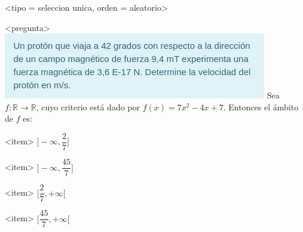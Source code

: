 <tipo = seleccion unica, orden = aleatorio>

<pregunta>
\includegraphics{preg1.png}
Sea $f:\mathbb R \to \mathbb R$, cuyo criterio est\'a dado por $f(x) = 7x^2 -4x +7$. Entonces el \'ambito de $f$ es:


<item>
$\bigg]{-}\infty, \dfrac{2}{7}\bigg]$

<item>
$\bigg]{-}\infty, \dfrac{45}{7}\bigg]$

<item>
$\bigg[\dfrac{2}{7}, +\infty\bigg[$

<item>
$\bigg[\dfrac{45}{7}, +\infty\bigg[$




